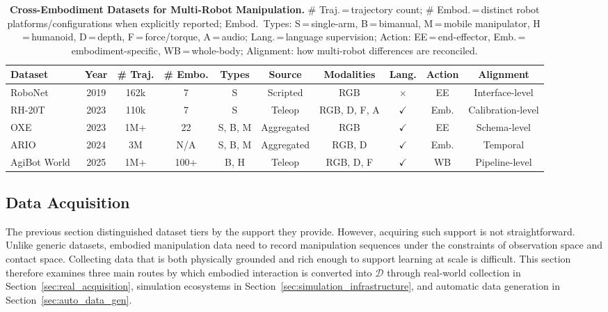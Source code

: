 \documentclass[acmsmall,screen,review]{acmart}
\begin{document}
\begin{table}[!t]
\centering
\caption{\textbf{Cross-Embodiment Datasets for Multi-Robot Manipulation.}
\# Traj.\,=\,trajectory count;
\# Embod.\,=\,distinct robot platforms/configurations when explicitly reported;
Embod.\ Types: S\,=\,single-arm, B\,=\,bimanual, M\,=\,mobile manipulator, H\,=\,humanoid,
 D\,=\,depth, F\,=\,force/torque, A\,=\,audio;
Lang.\,=\,language supervision;
Action: EE\,=\,end-effector, Emb.\,=\,embodiment-specific, WB\,=\,whole-body;
Alignment: how multi-robot differences are reconciled.}\label{tab:foundation_datasets}
\scriptsize
\begin{tabular}{lccccccccc}
\toprule
\textbf{Dataset} & \textbf{Year} & \textbf{\# Traj.} & \textbf{\# Embo.} & \textbf{Types} & \textbf{Source} & \textbf{Modalities} & \textbf{Lang.} & \textbf{Action} & \textbf{Alignment} \\
\midrule
RoboNet~\cite{dasari2020robonet} & 2019 & 162k & 7 & S & Scripted & RGB & $\times$ & EE & Interface-level \\
RH-20T~\cite{fang2023rh} & 2023 & 110k & 7 & S & Teleop & RGB, D, F, A & $\checkmark$ & Emb. & Calibration-level \\
OXE~\cite{padalkar2023open} & 2023 & 1M+ & 22 & S, B, M & Aggregated & RGB & $\checkmark$ & EE & Schema-level \\
ARIO~\cite{wang2024ario} & 2024 & 3M & N/A & S, B, M & Aggregated & RGB, D & $\checkmark$ & Emb. & Temporal \\
AgiBot World~\cite{agibot2025} & 2025 & 1M+ & 100+ & B, H & Teleop & RGB, D, F & $\checkmark$ & WB & Pipeline-level \\
\bottomrule
\end{tabular}
\end{table}

\subsection{Data Acquisition}\label{sec:data_acquisition}

The previous section distinguished dataset tiers by the support they provide. 
However, acquiring such support is not straightforward. 
Unlike generic datasets, embodied manipulation data need to record manipulation sequences under the constraints of observation space and contact space. 
Collecting data that is both physically grounded and rich enough to support learning at scale is difficult. 
This section therefore examines three main routes by which embodied interaction is converted into \(\mathcal{D}\) through real-world collection in Section~\ref{sec:real_acquisition}, simulation ecosystems in Section~\ref{sec:simulation_infrastructure}, and automatic data generation in Section~\ref{sec:auto_data_gen}. 
\end{document}
